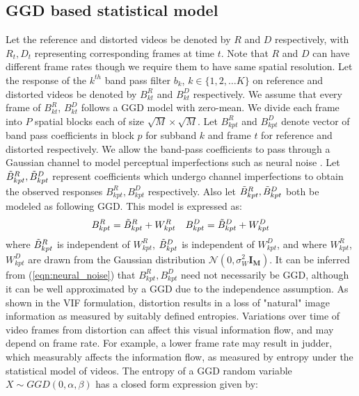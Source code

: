 \documentclass[journal]{IEEEtran}
\begin{document}
\vspace{-7pt}
\subsection{GGD based statistical model}
\label{subsec:GGD_model}
Let the reference and distorted videos be denoted by $R$ and $D$ respectively, with $R_t,D_t$ representing corresponding frames at time $t$. Note that $R$ and $D$ can have different frame rates though we require them to have same spatial resolution. Let the response of the $k^{th}$ band pass filter $b_k$, $k\in \{1,2,\ldots K\}$ on reference and distorted videos be denoted by $B_{kt}^R$ and $B_{kt} ^D$ respectively. We assume that every frame of $B_{kt}^R$, $B_{kt}^D$ follows a GGD model with zero-mean. We divide each frame into $P$ spatial blocks each of size $\sqrt{M} \times \sqrt{M}$. Let $B_{kpt}^R$ and $B_{kpt}^D$ denote vector of band pass coefficients in block $p$ for subband $k$ and frame $t$ for reference and distorted respectively. We allow the band-pass coefficients to pass through a Gaussian channel to model perceptual imperfections such as neural noise \cite{sheikh2006image,soundararajan2012video}. Let $\Tilde{B}_{kpt}^R,\Tilde{B}_{kpt}^D$ represent coefficients which undergo channel imperfections to obtain the observed responses $B_{kpt}^R,B_{kpt}^D$ respectively. Also let $\Tilde{B}_{kpt}^R,\Tilde{B}_{kpt}^D$ both be modeled as following GGD. This model is expressed as:
\begin{align}
    B_{kpt}^R = \Tilde{B}_{kpt}^R + W_{kpt}^R \quad B_{kpt}^D = \Tilde{B}_{kpt}^D + W_{kpt} ^D
    \label{eqn:neural_noise}
\end{align}
where $\Tilde{B}_{kpt}^R$ is independent of $W_{kpt}^R$, $\Tilde{B}_{kpt}^D$ is independent of $W_{kpt}^D$, and where $W_{kpt}^R$, $W_{kpt}^D$ are drawn from the Gaussian distribution $\mathcal{N}(0,\sigma_W ^2 \mathbf{I_M})$. It can be inferred from (\ref{eqn:neural_noise}) that $B_{kpt}^R,B_{kpt}^D$ need not necessarily be GGD, although it can be well approximated by a GGD \cite{zhao2004sum} due to the independence assumption. As shown in the VIF \cite{sheikh2006image} formulation, distortion results in a loss of "natural" image information as measured by suitably defined entropies. Variations over time of video frames from distortion can affect this visual information flow, and may depend on frame rate. For example, a lower frame rate may result in judder, which measurably affects the information flow, as measured by entropy under the statistical model of videos. The entropy of a GGD random variable $X \sim GGD(0,\alpha,\beta)$ has a closed form expression given by:
\end{document}
